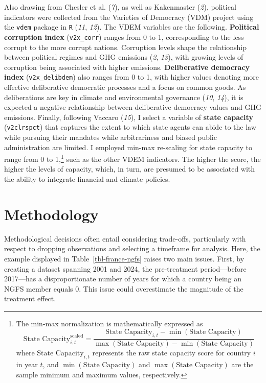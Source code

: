 \documentclass[
  12pt,
  letterpaper,
]{article}
\begin{document}
Also drawing from Chesler et al. (\emph{7}), as well as Kakenmaster
(\emph{2}), political indicators were collected from the Varieties of
Democracy (VDM) project using the \texttt{vdem} package in \texttt{R}
(\emph{11}, \emph{12}). The VDEM variables are the following.
\textbf{Political corruption index} (\texttt{v2x\_corr}) ranges from 0
to 1, corresponding to the less corrupt to the more corrupt nations.
Corruption levels shape the relationship between political regimes and
GHG emissions (\emph{2}, \emph{13}), with growing levels of corruption
being associated with higher emissions. \textbf{Deliberative democracy
index} (\texttt{v2x\_delibdem}) also ranges from 0 to 1, with higher
values denoting more effective deliberative democratic processes and a
focus on common goods. As deliberations are key in climate and
environmental governance (\emph{10}, \emph{14}), it is expected a
negative relationship between deliberative democracy values and GHG
emissions. Finally, following Vaccaro (\emph{15}), I select a variable
of \textbf{state capacity} (\texttt{v2clrspct}) that captures the extent
to which state agents can abide to the law while pursuing their mandates
while arbitrariness and biased public administration are limited. I
employed min-max re-scaling for state capacity to range from 0 to
1,\footnote{The min-max normalization is mathematically expressed as \[
  \text{State Capacity}_{i,t}^{\text{scaled}} = \frac{\text{State Capacity}_{i,t} - \min(\text{State Capacity})}{\max(\text{State Capacity}) - \min(\text{State Capacity})}
  \] where \(\text{State Capacity}_{i,t}\) represents the raw state
  capacity score for country \(i\) in year \(t\), and
  \(\min(\text{State Capacity})\) and \(\max(\text{State Capacity})\)
  are the sample minimum and maximum values, respectively.} such as the
other VDEM indicators. The higher the score, the higher the levels of
capacity, which, in turn, are presumed to be associated with the ability
to integrate financial and climate policies.

\section{Methodology}\label{sec-methods}

Methodological decisions often entail considering trade-offs,
particularly with respect to dropping observations and selecting a
timeframe for analysis. Here, the example displayed in
Table~\ref{tbl-france-ngfs} raises two main issues. First, by creating a
dataset spanning 2001 and 2024, the pre-treatment period---before
2017---has a disproportionate number of years for which a country being
an NGFS member equals 0. This issue could overestimate the magnitude of
the treatment effect.
\end{document}
